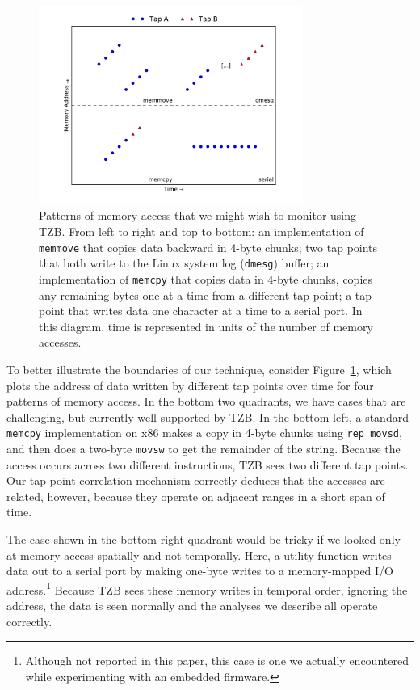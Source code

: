 \begin{figure}[t]
    \begin{center}
        \includegraphics[width=3.4in]{figures/memaccess.pdf}
    \end{center}
    \caption{Patterns of memory access that we might wish to monitor
    using TZB. From left to right and top to bottom: an implementation
    of \texttt{memmove} that copies data backward in 4-byte chunks; two
    tap points that both write to the Linux system log (\texttt{dmesg})
    buffer; an implementation of \texttt{memcpy} that copies data in
    4-byte chunks, copies any remaining bytes one at a time from a
    different tap point; a tap point that writes data one character at
    a time to a serial port. In this diagram, time is represented in
    units of the number of memory accesses.}
    \label{fig:memaccess}
\end{figure}

To better illustrate the boundaries of our technique, consider
Figure~\ref{fig:memaccess}, which plots the address of data written by
different tap points over time for four patterns of memory access. In
the bottom two quadrants, we have cases that are challenging, but
currently well-supported by TZB. In the bottom-left, a standard
\texttt{memcpy} implementation on x86 makes a copy in 4-byte chunks
using \texttt{rep movsd}, and then does a two-byte \texttt{movsw} to get
the remainder of the string. Because the access occurs across two
different instructions, TZB sees two different tap points. Our tap point
correlation mechanism correctly deduces that the accesses are related,
however, because they operate on adjacent ranges in a short span of
time.

The case shown in the bottom right quadrant would be tricky if we looked
only at memory access spatially and not temporally. Here, a utility
function writes data out to a serial port by making one-byte writes to a
memory-mapped I/O address.\footnote{Although not reported in this paper,
this case is one we actually encountered while experimenting with an
embedded firmware.} Because TZB sees these memory writes in
temporal order, ignoring the address, the data is seen normally and the
analyses we describe all operate correctly.

